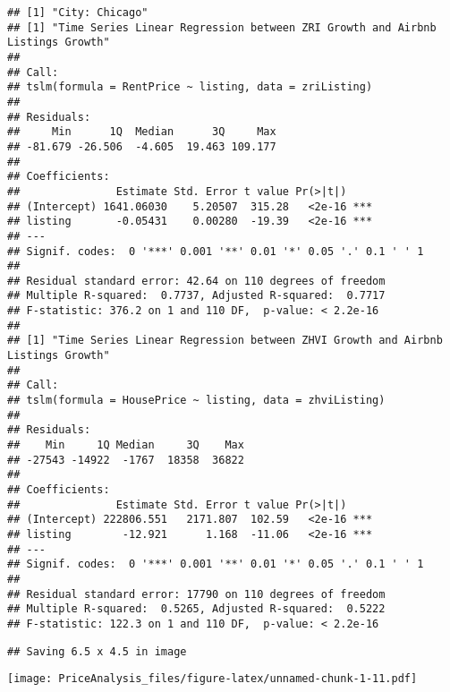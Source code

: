 \documentclass[
]{article}
\begin{document}
\begin{verbatim}
## [1] "City: Chicago"
## [1] "Time Series Linear Regression between ZRI Growth and Airbnb Listings Growth"
## 
## Call:
## tslm(formula = RentPrice ~ listing, data = zriListing)
## 
## Residuals:
##     Min      1Q  Median      3Q     Max 
## -81.679 -26.506  -4.605  19.463 109.177 
## 
## Coefficients:
##               Estimate Std. Error t value Pr(>|t|)    
## (Intercept) 1641.06030    5.20507  315.28   <2e-16 ***
## listing       -0.05431    0.00280  -19.39   <2e-16 ***
## ---
## Signif. codes:  0 '***' 0.001 '**' 0.01 '*' 0.05 '.' 0.1 ' ' 1
## 
## Residual standard error: 42.64 on 110 degrees of freedom
## Multiple R-squared:  0.7737, Adjusted R-squared:  0.7717 
## F-statistic: 376.2 on 1 and 110 DF,  p-value: < 2.2e-16
## 
## [1] "Time Series Linear Regression between ZHVI Growth and Airbnb Listings Growth"
## 
## Call:
## tslm(formula = HousePrice ~ listing, data = zhviListing)
## 
## Residuals:
##    Min     1Q Median     3Q    Max 
## -27543 -14922  -1767  18358  36822 
## 
## Coefficients:
##               Estimate Std. Error t value Pr(>|t|)    
## (Intercept) 222806.551   2171.807  102.59   <2e-16 ***
## listing        -12.921      1.168  -11.06   <2e-16 ***
## ---
## Signif. codes:  0 '***' 0.001 '**' 0.01 '*' 0.05 '.' 0.1 ' ' 1
## 
## Residual standard error: 17790 on 110 degrees of freedom
## Multiple R-squared:  0.5265, Adjusted R-squared:  0.5222 
## F-statistic: 122.3 on 1 and 110 DF,  p-value: < 2.2e-16
\end{verbatim}

\begin{verbatim}
## Saving 6.5 x 4.5 in image
\end{verbatim}

\texttt{[image: PriceAnalysis\_files/figure-latex/unnamed-chunk-1-11.pdf]}
\end{document}
